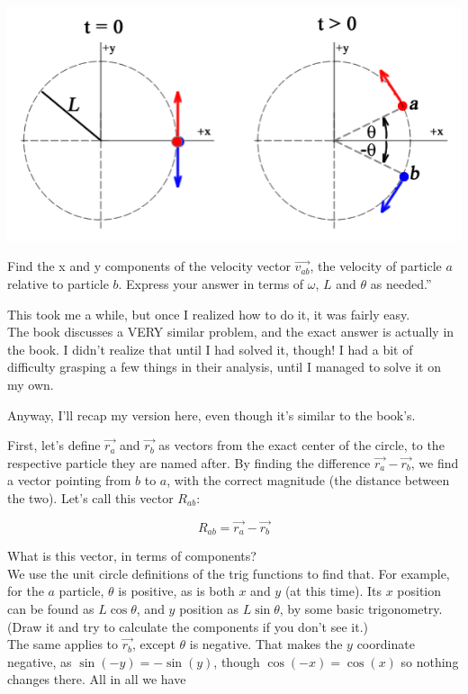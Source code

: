 \documentclass[12pt,a4paper]{report}
\begin{document}
\begin{center}
\includegraphics[scale=0.75]{Graphics/h2p8}
\end{center}

Find the x and y components of the velocity vector $\vec{v_{ab}}$, the velocity of particle $a$ relative to particle $b$. Express your answer in terms of $\omega$, $L$ and $\theta$ as needed.''

This took me a while, but once I realized how to do it, it was fairly easy.\\
The book discusses a VERY similar problem, and the exact answer is actually in the book. I didn't realize that until I had solved it, though! I had a bit of difficulty grasping a few things in their analysis, until I managed to solve it on my own.

Anyway, I'll recap my version here, even though it's similar to the book's.

First, let's define $\vec{r_a}$ and $\vec{r_b}$ as vectors from the exact center of the circle, to the respective particle they are named after. By finding the difference $\vec{r_a} - \vec{r_b}$, we find a vector pointing from $b$ to $a$, with the correct magnitude (the distance between the two). Let's call this vector $R_{ab}$:

\begin{equation}
R_{ab} = \vec{r_a} - \vec{r_b}
\end{equation}

What is this vector, in terms of components?\\
We use the unit circle definitions of the trig functions to find that. For example, for the $a$ particle, $\theta$ is positive, as is both $x$ and $y$ (at this time). Its $x$ position can be found as $L \cos \theta$, and $y$ position as $L \sin \theta$, by some basic trigonometry. (Draw it and try to calculate the components if you don't see it.)\\
The same applies to $\vec{r_b}$, except $\theta$ is negative. That makes the $y$ coordinate negative, as $\sin(-y) = -\sin(y)$, though $\cos(-x) = \cos(x)$ so nothing changes there. All in all we have
\end{document}
